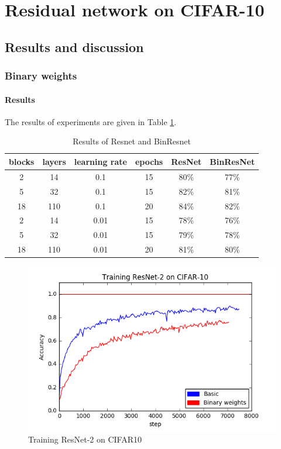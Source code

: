 \documentclass[licencjacka]{pracamgr}
\begin{document}
	\section{Residual network on CIFAR-10}
		\subsection{Results and discussion}
			\subsubsection{Binary weights}
		        \paragraph{Results} 
		     
		        The results of experiments are given in Table \ref{table:3}.
		        \begin{table}[H]
                    \caption{Results of Resnet and BinResnet}
                    \centering
                    \begin{tabular}{c c c c c c}
                    \hline\hline
                    blocks & layers & learning rate & epochs & ResNet & BinResNet  \\ [0.5ex]
                    \hline
                            2 & 14  & 0.1   & 15 & 80\% & 77\% \\
                            5 & 32  & 0.1   & 15 & 82\% & 81\% \\
                            18& 110 & 0.1   & 20 & 84\% & 82\%\\
                    \hline
                            2 & 14  & 0.01  & 15 & 78\% & 76\% \\
                            5 & 32  & 0.01  & 15 & 79\% & 78\% \\
                            18 & 110 & 0.01 & 20 & 81\% & 80\% \\
                    \hline
                    \end{tabular}
                    \label{table:3}
	            \end{table}
	            \begin{figure}[h]
				\centering
				\caption{Training ResNet-2 on CIFAR10}
 				\includegraphics[width=\textwidth]{images/ResNet-2-training}
			\end{figure}
\end{document}
